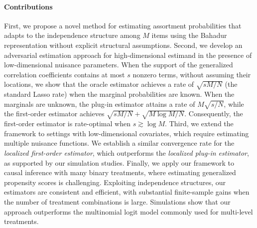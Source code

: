\documentclass[11pt]{article}
\begin{document}
\paragraph{Contributions}
First, we propose a novel method for estimating assortment probabilities that adapts to the independence structure among $M$ items using the Bahadur representation \citep{bahadur1959representation} without explicit structural assumptions. Second, we develop an adversarial estimation approach for high-dimensional estimand in the presence of low-dimensional nuisance parameters. When the support of the generalized correlation coefficients contains at most $s$ nonzero terms, without assuming their locations, we show that the oracle estimator achieves a rate of $\sqrt{sM/N}$ (the standard Lasso rate) when the marginal probabilities are known. When the marginals are unknown, the plug-in estimator attains a rate of $M\sqrt{s/N}$, while the first-order estimator achieves $\sqrt{sM/N}+\sqrt{M\log M/N}$. Consequently, the first-order estimator is rate-optimal when $s\gtrsim\log M$. Third, we extend the framework to settings with low-dimensional covariates, which require estimating multiple nuisance functions. We establish a similar convergence rate for the \textit{localized first-order estimator}, which outperforms the \textit{localized plug-in estimator}, as supported by our simulation studies. Finally, we apply our framework to causal inference with many binary treatments, where estimating generalized propensity scores \citep[e.g.,][]{rosenbaum1983central,imbens2000role} is challenging. Exploiting independence structures, our estimators are consistent and efficient, with substantial finite-sample gains when the number of treatment combinations is large. Simulations show that our approach outperforms the multinomial logit model \citep[e.g.][]{imai2004causal,li2019propensity,yang2016propensity} commonly used for multi-level treatments.
\end{document}
